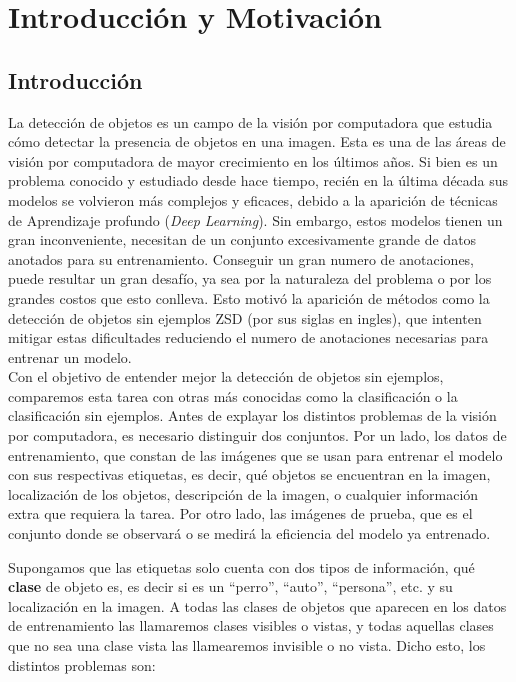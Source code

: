 \chapter{Introducción y Motivación} \label{cap:intro}

\section{Introducción} \label{sec:introduccion}
La detección de objetos es un campo de la visión por computadora que estudia cómo detectar la presencia de objetos en una imagen. Esta es una de las áreas de visión por computadora de mayor crecimiento en los últimos años. Si bien es un problema conocido y estudiado desde hace tiempo, recién en la última década sus modelos se volvieron más complejos y eficaces, debido a la aparición de técnicas  de Aprendizaje profundo (\textit{Deep Learning}). Sin embargo, estos modelos tienen un gran inconveniente, necesitan de un conjunto excesivamente grande de datos anotados para su entrenamiento. Conseguir un gran numero de anotaciones, puede resultar un gran desafío, ya sea por la naturaleza del problema o por los grandes costos que esto conlleva. Esto motivó la aparición de métodos como la detección de objetos sin ejemplos ZSD (por sus siglas en ingles), que intenten mitigar estas dificultades reduciendo el numero de anotaciones necesarias para entrenar un modelo.\\

Con el objetivo de entender mejor la detección de objetos sin ejemplos, comparemos esta tarea con otras más conocidas como la clasificación o la clasificación sin ejemplos. Antes de explayar los distintos problemas de la visión por computadora, es necesario distinguir dos conjuntos. Por un lado, los datos de entrenamiento, que constan de las imágenes que se usan para entrenar el modelo con sus respectivas etiquetas, es decir, qué objetos se encuentran en la imagen, localización de los objetos, descripción de la imagen, o cualquier información extra que requiera la tarea. Por otro lado, las imágenes de prueba, que es el conjunto donde se observará o se medirá la eficiencia del modelo ya entrenado. 

Supongamos que las etiquetas solo cuenta con dos tipos de información, qué \textbf{clase} de objeto es, es decir si es un ``perro'', ``auto'', ``persona'', etc. y su localización en la imagen. A todas las clases de objetos que aparecen en los datos de entrenamiento las llamaremos clases visibles o vistas, y todas aquellas clases que no sea una clase vista las llamearemos invisible o no vista. Dicho esto, los distintos problemas son:

